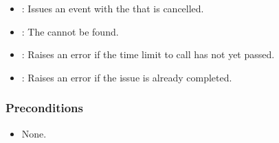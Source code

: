 \documentclass[a4paper,10pt,english]{sphinxmanual}
\begin{document}
\begin{itemize}
\item {} 
: Issues an event with the  that is cancelled.

\end{itemize}

\begin{itemize}
\item {} 
: The  cannot be found.

\item {} 
: Raises an error if the time limit to call  has not yet passed.

\item {} 
: Raises an error if the issue is already completed.

\end{itemize}


\subsubsection{Preconditions}
\label{\detokenize{spec/issue:id10}}\begin{itemize}
\item {} 
None.

\end{itemize}
\end{document}

